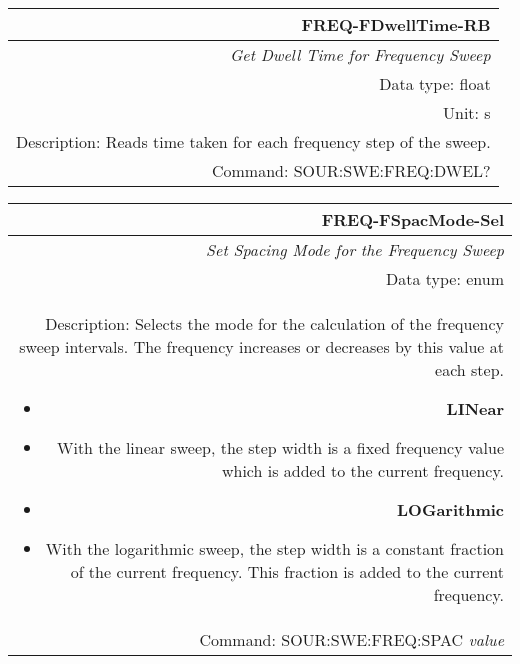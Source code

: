 \documentclass[openany]{article}
\begin{document}
		\begin{tabular}{N}
			\hline
			\bfseries FREQ-FDwellTime-RB \\ \hline
			\emph{Get Dwell Time for Frequency Sweep} \\
			Data type: float \\
			Unit: s \\
			Description: Reads time taken for each frequency step of the sweep. \\
			Command: SOUR:SWE:FREQ:DWEL? \\

		\end{tabular}
%
		\begin{tabular}{N}
			\hline
			\bfseries FREQ-FSpacMode-Sel \\ \hline
			\emph{Set Spacing Mode for the Frequency Sweep} \\
			Data type: enum \\
			Description: Selects the mode for the calculation of the frequency sweep intervals. The frequency increases or decreases by this value at each step.\begin{itemize}[noitemsep]
				\small
				\item[] \textbf{LINear}
				\item[] With the linear sweep, the step width is a fixed frequency value which is added to the current frequency.
				\item[] \textbf{LOGarithmic}
				\item[] With the logarithmic sweep, the step width is a constant fraction of the current frequency. This fraction is added to the current frequency.
			\end{itemize} \\
			Command: SOUR:SWE:FREQ:SPAC \emph{value} \\

		\end{tabular}
\end{document}
